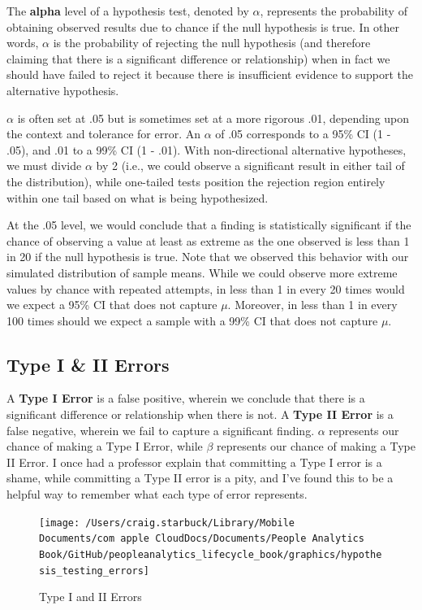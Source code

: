 \documentclass[
]{book}
\begin{document}
The \textbf{alpha} level of a hypothesis test, denoted by \(\alpha\), represents the probability of obtaining observed results due to chance if the null hypothesis is true. In other words, \(\alpha\) is the probability of rejecting the null hypothesis (and therefore claiming that there is a significant difference or relationship) when in fact we should have failed to reject it because there is insufficient evidence to support the alternative hypothesis.

\(\alpha\) is often set at .05 but is sometimes set at a more rigorous .01, depending upon the context and tolerance for error. An \(\alpha\) of .05 corresponds to a 95\% CI (1 - .05), and .01 to a 99\% CI (1 - .01). With non-directional alternative hypotheses, we must divide \(\alpha\) by 2 (i.e., we could observe a significant result in either tail of the distribution), while one-tailed tests position the rejection region entirely within one tail based on what is being hypothesized.

At the .05 level, we would conclude that a finding is statistically significant if the chance of observing a value at least as extreme as the one observed is less than 1 in 20 if the null hypothesis is true. Note that we observed this behavior with our simulated distribution of sample means. While we could observe more extreme values by chance with repeated attempts, in less than 1 in every 20 times would we expect a 95\% CI that does not capture \(\mu\). Moreover, in less than 1 in every 100 times should we expect a sample with a 99\% CI that does not capture \(\mu\).

\hypertarget{type-i-ii-errors}{%
\subsection{Type I \& II Errors}\label{type-i-ii-errors}}

A \textbf{Type I Error} is a false positive, wherein we conclude that there is a significant difference or relationship when there is not. A \textbf{Type II Error} is a false negative, wherein we fail to capture a significant finding. \(\alpha\) represents our chance of making a Type I Error, while \(\beta\) represents our chance of making a Type II Error. I once had a professor explain that committing a Type I error is a shame, while committing a Type II error is a pity, and I've found this to be a helpful way to remember what each type of error represents.

\begin{figure}

{\centering \texttt{[image: /Users/craig.starbuck/Library/Mobile Documents/com~apple~CloudDocs/Documents/People Analytics Book/GitHub/peopleanalytics\_lifecycle\_book/graphics/hypothesis\_testing\_errors]} 

}

\caption{Type I and II Errors}\label{fig:hyp-errs}
\end{figure}
\end{document}
